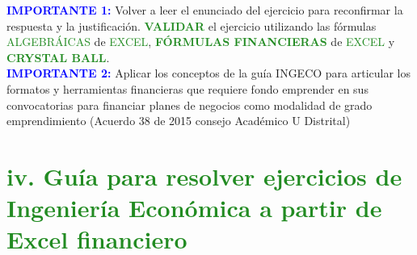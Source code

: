 \textcolor{Blue}{\textbf{IMPORTANTE 1:}} Volver a leer el enunciado del ejercicio para reconfirmar la respuesta y la justificación. \textbf{\textcolor{ForestGreen}{VALIDAR}} el ejercicio utilizando las fórmulas \textcolor{ForestGreen}{ALGEBRÁICAS} de \textcolor{ForestGreen}{EXCEL}, \textbf{\textcolor{ForestGreen}{FÓRMULAS FINANCIERAS}} de \textcolor{ForestGreen}{EXCEL} y \textbf{\textcolor{ForestGreen}{CRYSTAL BALL}}.\\

\textcolor{Blue}{\textbf{IMPORTANTE 2:}} Aplicar los conceptos de la guía INGECO para articular los formatos y herramientas financieras que requiere fondo emprender en sus convocatorias para financiar planes de negocios como modalidad de grado emprendimiento (Acuerdo 38 de 2015 consejo Académico U Distrital)

\section*{\textcolor{ForestGreen}{iv. Guía para resolver ejercicios de Ingeniería Económica a partir de Excel financiero}}

